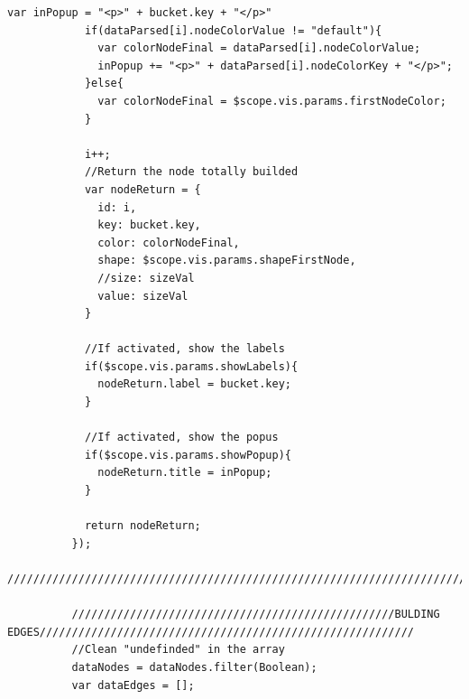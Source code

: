 \documentclass[a4paper, 12pt]{book}
\begin{document}
\begin{lstlisting}[frame=single]
            var inPopup = "<p>" + bucket.key + "</p>"
            if(dataParsed[i].nodeColorValue != "default"){
              var colorNodeFinal = dataParsed[i].nodeColorValue;
              inPopup += "<p>" + dataParsed[i].nodeColorKey + "</p>";
            }else{
              var colorNodeFinal = $scope.vis.params.firstNodeColor;
            }

            i++;
            //Return the node totally builded
            var nodeReturn = {
              id: i,
              key: bucket.key,
              color: colorNodeFinal,
              shape: $scope.vis.params.shapeFirstNode,
              //size: sizeVal
              value: sizeVal
            }

            //If activated, show the labels
            if($scope.vis.params.showLabels){
              nodeReturn.label = bucket.key;
            }

            //If activated, show the popus
            if($scope.vis.params.showPopup){
              nodeReturn.title = inPopup;
            }

            return nodeReturn;
          });
          //////////////////////////////////////////////////////////////////////////////////////////////////////////////

          //////////////////////////////////////////////////BULDING EDGES//////////////////////////////////////////////////////////
          //Clean "undefinded" in the array
          dataNodes = dataNodes.filter(Boolean);
          var dataEdges = [];


\end{lstlisting}
\end{document}
